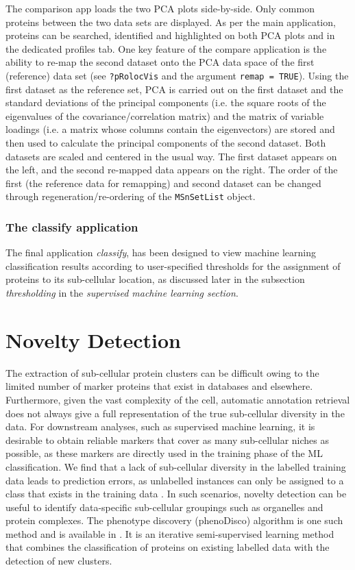 The comparison app loads the two PCA plots side-by-side. Only common
proteins between the two data sets are displayed. As per the main
application, proteins can be searched, identified and highlighted on
both PCA plots and in the dedicated profiles tab. One key feature of
the compare application is the ability to re-map the second dataset
onto the PCA data space of the first (reference) data set (see
\texttt{?pRolocVis} and the argument \texttt{remap = TRUE}). Using the first dataset
as the reference set, PCA is carried out on the first dataset and the
standard deviations of the principal components (i.e. the square roots
of the eigenvalues of the covariance/correlation matrix) and the
matrix of variable loadings (i.e. a matrix whose columns contain the
eigenvectors) are stored and then used to calculate the principal
components of the second dataset. Both datasets are scaled and
centered in the usual way. The first dataset appears on the left, and
the second re-mapped data appears on the right. The order of the first
(the reference data for remapping) and second dataset can be changed
through regeneration/re-ordering of the \texttt{MSnSetList} object.

\subsubsection*{The classify application}
The final application \textit{classify}, has been designed to view
machine learning classification results according to user-specified
thresholds for the assignment of proteins to its sub-cellular
location, as discussed later in the subsection \textit{thresholding}
in the \textit{supervised machine learning section}.


\section*{Novelty Detection}

The extraction of sub-cellular protein clusters can be difficult owing
to the limited number of marker proteins that exist in databases and
elsewhere. Furthermore, given the vast complexity of the cell,
automatic annotation retrieval does not always give a full
representation of the true sub-cellular diversity in the data. For
downstream analyses, such as supervised machine learning, it is
desirable to obtain reliable markers that cover as many sub-cellular
niches as possible, as these markers are directly used in the training
phase of the ML classification. We find that a lack of sub-cellular
diversity in the labelled training data leads to prediction errors, as
unlabelled instances can only be assigned to a class that exists in
the training data \cite{Breckels:2013}. In such scenarios, novelty
detection can be useful to identify data-specific sub-cellular
groupings such as organelles and protein complexes. The phenotype
discovery (phenoDisco) algorithm \cite{Breckels:2013} is one such method
and is available in . It is an iterative
semi-supervised learning method that combines the classification of
proteins on existing labelled data with the detection of new clusters.

